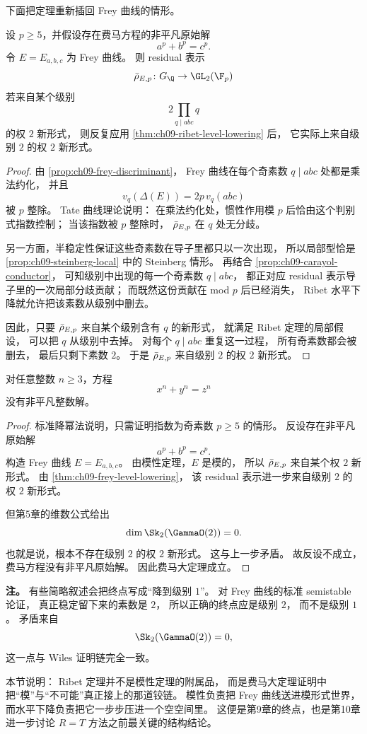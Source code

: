 下面把定理重新插回 Frey 曲线的情形。

\begin{theorem}
\label{thm:ch09-frey-level-lowering}
设 $p\ge 5$，并假设存在费马方程的非平凡原始解
\[
  a^p+b^p=c^p.
\]
令 $E=E_{a,b,c}$ 为 Frey 曲线。
则 residual 表示
\[
  \rhobar_{E,p}\colon G_\Q\to \GL_2(\F_p)
\]
若来自某个级别
\[
  2\prod_{q\mid abc}q
\]
的权 $2$ 新形式，
则反复应用 \cref{thm:ch09-ribet-level-lowering} 后，
它实际上来自级别 $2$ 的权 $2$ 新形式。
\end{theorem}

\begin{proof}
由 \cref{prop:ch09-frey-discriminant}，
Frey 曲线在每个奇素数 $q\mid abc$ 处都是乘法约化，
并且
\[
  v_q(\Delta(E))=2p\,v_q(abc)
\]
被 $p$ 整除。
Tate 曲线理论说明：
在乘法约化处，惯性作用模 $p$ 后恰由这个判别式指数控制；
当该指数被 $p$ 整除时，
$\bar{\rho}_{E,p}$ 在 $q$ 处无分歧。

另一方面，半稳定性保证这些奇素数在导子里都只以一次出现，
所以局部型恰是 \cref{prop:ch09-steinberg-local} 中的 Steinberg 情形。
再结合 \cref{prop:ch09-carayol-conductor}，
可知级别中出现的每一个奇素数 $q\mid abc$，
都正对应 residual 表示导子里的一次局部分歧贡献；
而既然这份贡献在 mod $p$ 后已经消失，
Ribet 水平下降就允许把该素数从级别中删去。

因此，只要 $\bar{\rho}_{E,p}$ 来自某个级别含有 $q$ 的新形式，
就满足 Ribet 定理的局部假设，
可以把 $q$ 从级别中去掉。
对每个 $q\mid abc$ 重复这一过程，
所有奇素数都会被删去，
最后只剩下素数 $2$。
于是 $\bar{\rho}_{E,p}$ 来自级别 $2$ 的权 $2$ 新形式。
\end{proof}

\begin{theorem}[费马大定理]
\label{thm:ch09-flt-final}
对任意整数 $n\ge 3$，方程
\[
  x^n+y^n=z^n
\]
没有非平凡整数解。
\end{theorem}

\begin{proof}
标准降幂法说明，只需证明指数为奇素数 $p\ge 5$ 的情形。
反设存在非平凡原始解
\[
  a^p+b^p=c^p.
\]
构造 Frey 曲线 $E=E_{a,b,c}$。
由模性定理，$E$ 是模的，
所以 $\bar{\rho}_{E,p}$ 来自某个权 $2$ 新形式。
由 \cref{thm:ch09-frey-level-lowering}，
该 residual 表示进一步来自级别 $2$ 的权 $2$ 新形式。

但第5章的维数公式给出
\[
  \dim \Sk_2(\GammaO(2))=0.
\]
也就是说，根本不存在级别 $2$ 的权 $2$ 新形式。
这与上一步矛盾。
故反设不成立，
费马方程没有非平凡原始解。
因此费马大定理成立。
\end{proof}

\textbf{注。}
有些简略叙述会把终点写成“降到级别 $1$”。
对 Frey 曲线的标准 semistable 论证，
真正稳定留下来的素数是 $2$，
所以正确的终点应是级别 $2$，
而不是级别 $1$。
矛盾来自
\[
  \Sk_2(\GammaO(2))=0,
\]
这一点与 Wiles 证明链完全一致。

本节说明：
Ribet 定理并不是模性定理的附属品，
而是费马大定理证明中把“模”与“不可能”真正接上的那道铰链。
模性负责把 Frey 曲线送进模形式世界，
而水平下降负责把它一步步压进一个空空间里。
这便是第9章的终点，也是第10章进一步讨论 $R=T$ 方法之前最关键的结构结论。
